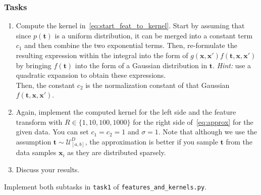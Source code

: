 \documentclass{article}
\renewcommand{\vec}[1]{\textbf{#1}}
\renewcommand{\vec}[1]{\textbf{#1}}
\begin{document}
\subsubsection*{Tasks}
\begin{enumerate}
    \item Compute the kernel in~\eqref{eq:start_feat_to_kernel}. Start by assuming that since $p(\vec t)$ is a uniform distribution, it can be merged into a constant term $c_1$ and then combine the two exponential terms. Then, re-formulate the resulting expression within the integral into the form of $ g(\vec x, \vec x') f(\vec t, \vec x, \vec x')$ by bringing $f(\vec t)$ into the form of a Gaussian distribution in $\vec t$.
\textit{Hint:} use a quadratic expansion to obtain these expressions. \\    
    Then, the constant $c_2$ is the normalization constant of that Gaussian $f(\vec t, \vec x, \vec x')$. 
    \item Again, implement the computed kernel for the left side and the feature transform with $R \in \{1,10,100,1000\}$ for the right side of~\eqref{eq:approx} for the given data. You can set $c_1=c_2=1$ and $\sigma=1$. Note that although we use the assumption $\vec t \sim \mathcal{U}^D_{[a,b]}$, the approximation is better if you sample $\vec t$ from the data samples $\vec x_i$ as they are distributed sparsely. 
    \item Discuss your results.
\end{enumerate}

Implement both subtasks in \texttt{task1} of \texttt{features\_and\_kernels.py}. 
\end{document}
